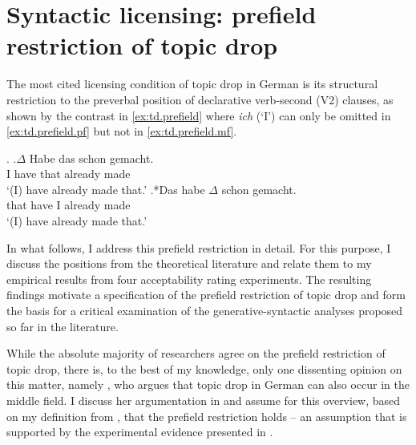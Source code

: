 \chapter{Syntactic licensing: prefield restriction of topic drop}\label{ch:topicality}
The most cited licensing condition of topic drop in German is its structural restriction \citep[1850]{reich2011} to the preverbal position of declarative verb-second (V2) clauses, as shown by the contrast in \ref{ex:td.prefield} where \textit{ich} (`I') can only be omitted in \ref{ex:td.prefield.pf} but not in  \ref{ex:td.prefield.mf}.

\ex.\label{ex:td.prefield}
\ag.\label{ex:td.prefield.pf}$\Delta$ Habe das schon gemacht.\\
I have that already made\\
`(I) have already made that.'
\bg.*\label{ex:td.prefield.mf}Das habe $\Delta$ schon gemacht.\\
that have I already made\\
`(I) have already made that.'

In what follows, I address this prefield restriction in detail.
For this purpose, I discuss the positions from the theoretical literature and relate them to my empirical results from four acceptability rating experiments.
The resulting findings motivate a specification of the prefield restriction of topic drop and form the basis for a critical examination of the generative-syntactic analyses proposed so far in the literature.

While the absolute majority of researchers agree on the prefield restriction of topic drop, there is, to the best of my knowledge, only one dissenting opinion on this matter, namely \citet{helmer2016}, who argues that topic drop in German can also occur in the middle field. 
I discuss her argumentation in  and assume for this overview, based on my definition from , that the prefield restriction holds -- an assumption that is supported by the experimental evidence presented in .

